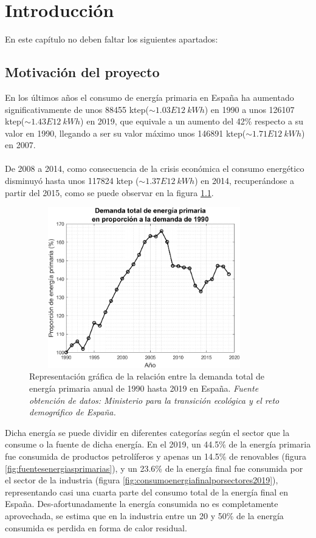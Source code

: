 \chapter{Introducción}

En este capítulo no deben faltar los siguientes apartados:

\section{Motivación del proyecto}

En los últimos años el consumo de energía primaria en España ha aumentado significativamente de unos 88455 ktep($\sim1.03E12 \ kWh$) en 1990 a unos 126107 ktep($\sim 1.43E12 \ kWh$) en 2019, que equivale a un aumento del 42\% respecto a su valor en 1990, llegando a ser su valor máximo unos 146891 ktep($\sim 1.71E12 \ kWh$) en 2007.\\\\
De 2008 a 2014, como consecuencia de la crisis económica el consumo energético disminuyó hasta unos 117824 ktep ($\sim 1.37E12 \ kWh$) en 2014, recuperándose a partir del 2015, como se puede observar en la figura \ref{fig:demandaenergiaprimariaproporcion1990}. \\


\begin{figure}[H]
	\centering
	\includegraphics[width=10cm, height=7cm]{figuras/DemandaEnergiaPrimariaProporcion1990}
	\caption[Relación entre demanda total de energía primaria anual]{Representación gráfica de la relación entre la demanda total de energía primaria anual de 1990 hasta 2019 en España. \textit{Fuente obtención de datos: Ministerio para la transición ecológica y el reto demográfico de España.} }
	\label{fig:demandaenergiaprimariaproporcion1990}
\end{figure}
Dicha energía se puede dividir en diferentes categorías según el sector que la consume o la fuente de dicha energía. En el 2019, un 44.5\% de la energía primaria fue consumida de productos petrolíferos y apenas un 14.5\% de renovables (figura \ref{fig:fuentesenergiasprimarias}), y un 23.6\% de la energía final fue consumida por el sector de la industria (figura \ref{fig:consumoenergiafinalporsectores2019}), representando casi una cuarta parte del consumo total de la energía final en España. Des-afortunadamente la energía consumida no es completamente aprovechada, se estima que en la industria entre un 20 y 50\% de la energía consumida es perdida en forma de calor residual\cite{recuperacionEnergiaIndustria2021}.

